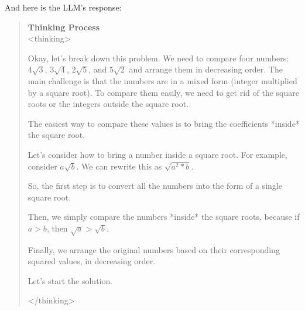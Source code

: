 \documentclass[11pt]{article}
\begin{document}
And here is the LLM's response:

\begin{quote} %
    \textbf{Thinking Process} \\
    <thinking>

    Okay, let's break down this problem. We need to compare four numbers:  $4\sqrt3$, $3\sqrt4$, $2\sqrt5$, and $5\sqrt2$ and arrange them in decreasing order. The main challenge is that the numbers are in a mixed form (integer multiplied by a square root). To compare them easily, we need to get rid of the square roots or the integers outside the square root.

    \vspace{1em}

    The easiest way to compare these values is to bring the coefficients *inside* the square root.

    \vspace{1em}

    Let's consider how to bring a number inside a square root. For example, consider $a\sqrt{b}$. We can rewrite this as $\sqrt{a^2 * b}$.

    \vspace{1em}

    So, the first step is to convert all the numbers into the form of a single square root.

    \vspace{1em}

    Then, we simply compare the numbers *inside* the square roots, because if $a > b$, then $\sqrt{a} > \sqrt{b}$.

    \vspace{1em}

    Finally, we arrange the original numbers based on their corresponding squared values, in decreasing order.

    \vspace{1em}

    Let's start the solution.

    </thinking>

    \vspace{1em}
\end{quote}
\end{document}

